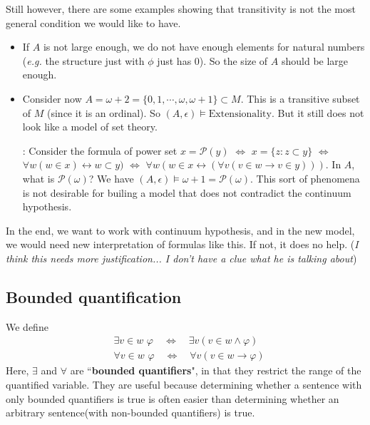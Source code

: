 \documentclass[12pt,a4paper]{article}
\newenvironment{subproof}
{\begin{changemargin}{0.5cm}{0.5cm} 
	}%
	{\end{changemargin}
}
\renewenvironment{i}
{\begin{itemize} 
	}%
	{\end{itemize}
}
\begin{document}
Still however, there are some examples showing that transitivity is not the most general condition we would like to have.
\begin{i}
\item If $A$ is not large enough, we do not have enough elements for natural numbers (\textit{e.g.} the structure just with $\phi$ just has 0). So the size of $A$ should be large enough.

\item Consider now $A= \omega +2 = \{0,1, \cdots, \omega, \omega+1 \} \subset M$. This is a transitive subset of $M$ (since it is an ordinal). So $(A, \epsilon) \models \text{Extensionality}$. But it still does not look like a model of set theory.
\begin{subproof}
: Consider the formula of power set $x = \mathscr{P}(y)$ $\Leftrightarrow$ $x= \{z : z\subset y \}$ $\Leftrightarrow$ $\forall w(w\in x) \leftrightarrow w\subset y)$ $\Leftrightarrow$ $\forall w (w\in x \leftrightarrow (\forall v(v\in w \rightarrow v\in y)))$. In $A$, what is $\mathscr{P}(\omega)$? We have $(A, \epsilon) \models \omega +1 = \mathscr{P}(\omega)$. This sort of phenomena is not desirable for builing a model that does not contradict the continuum hypothesis.
\end{subproof}
\end{i}
\s

In the end, we want to work with continuum hypothesis, and in the new model, we would need new interpretation of formulas like this. If not, it does no help. (\emph{I think this needs more justification... I don't have a clue what he is talking about})
\s

\subsection*{Bounded quantification}

We define
\begin{align*}
&\exists v\in w \,\, \varphi \quad \Leftrightarrow \quad \exists v (v\in w\wedge \varphi) \\
&\forall v\in w \,\, \varphi \quad \Leftrightarrow \quad \forall v (v\in w \rightarrow \varphi)
\end{align*}
Here, $\exists$ and $\forall$ are ``\textbf{bounded quantifiers}", in that they restrict the range of the quantified variable. They are useful because determining whether a sentence with only bounded quantifiers is true is often easier than determining whether an arbitrary sentence(with non-bounded quantifiers) is true.
\s
\end{document}
